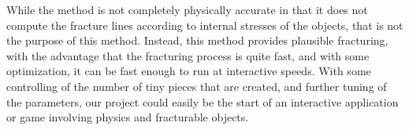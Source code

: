 \documentclass[tog]{acmsiggraph}
\begin{document}
While the method is not completely physically accurate in that it does
not compute the fracture lines according to internal stresses of the
objects, that is not the purpose of this method. Instead, this method
provides plausible fracturing, with the advantage that the fracturing
process is quite fast, and with some optimization, it can be fast
enough to run at interactive speeds. With some controlling of the
number of tiny pieces that are created, and further tuning of the
parameters, our project could easily be the start of an interactive
application or game involving physics and fracturable objects.



\end{document}

